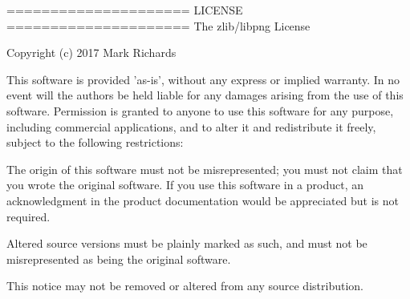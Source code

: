\begin{DoxyParagraph}{===================== L\-I\-C\-E\-N\-S\-E =====================}
The zlib/libpng License \par
 Copyright (c) 2017 Mark Richards \par
 \par
 This software is provided 'as-\/is', without any express or implied warranty. In no event will the authors be held liable for any damages arising from the use of this software. Permission is granted to anyone to use this software for any purpose, including commercial applications, and to alter it and redistribute it freely, subject to the following restrictions\-: \par

\begin{DoxyEnumerate}
\item The origin of this software must not be misrepresented; you must not claim that you wrote the original software. If you use this software in a product, an acknowledgment in the product documentation would be appreciated but is not required.
\item Altered source versions must be plainly marked as such, and must not be misrepresented as being the original software.
\item This notice may not be removed or altered from any source distribution. 
\end{DoxyEnumerate}
\end{DoxyParagraph}
